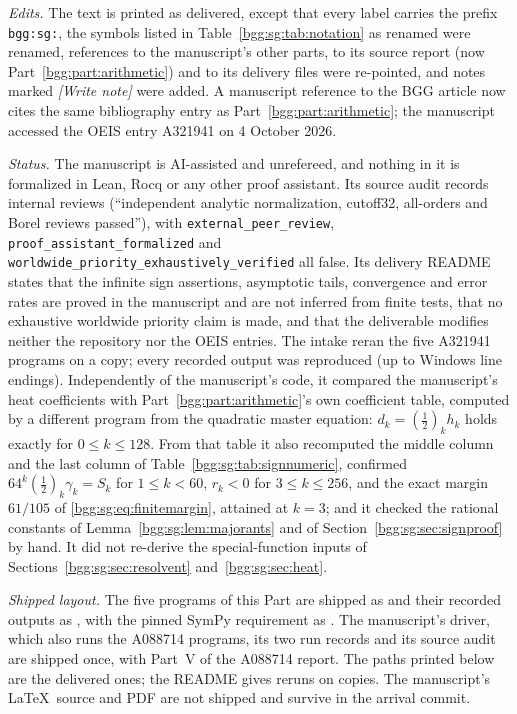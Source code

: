 \documentclass[11pt,a4paper]{article}
\numberwithin{equation}{section}
\theoremstyle{definition}
\theoremstyle{remark}
\theoremstyle{definition}
\begin{document}
\emph{Edits.} The text is printed as delivered, except that every label
carries the prefix \texttt{bgg:sg:}, the symbols listed in
Table~\ref{bgg:sg:tab:notation} as renamed were renamed, references to
the manuscript's other parts, to its source report (now
Part~\ref{bgg:part:arithmetic}) and to its delivery files were
re-pointed, and notes marked \emph{[Write note]} were added. A
manuscript reference to the BGG article now cites the same
bibliography entry as Part~\ref{bgg:part:arithmetic}; the manuscript
accessed the OEIS entry A321941 on 4 October 2026.

\emph{Status.} The manuscript is AI-assisted and unrefereed, and nothing
in it is formalized in Lean, Rocq or any other proof assistant. Its
source audit records internal reviews (``independent analytic
normalization, cutoff32, all-orders and Borel reviews passed''), with
\texttt{external\_peer\_review}, \texttt{proof\_assistant\_formalized} and
\texttt{worldwide\_priority\_exhaustively\_verified} all false. Its
delivery README states that the infinite sign assertions, asymptotic
tails, convergence and error rates are proved in the manuscript and are
not inferred from finite tests, that no exhaustive worldwide priority
claim is made, and that the deliverable modifies neither the repository
nor the OEIS entries. The intake reran the five A321941 programs on a
copy; every recorded output was reproduced (up to Windows line
endings). Independently of the manuscript's code, it compared the
manuscript's heat coefficients with Part~\ref{bgg:part:arithmetic}'s own
coefficient table, computed by a different program from the quadratic
master equation: $d_k=(\tfrac12)_kh_k$ holds exactly for
$0\le k\le128$. From that table it also recomputed the middle column
and the last column of Table~\ref{bgg:sg:tab:signnumeric}, confirmed
$64^k(\tfrac12)_k\gamma_k=S_k$ for $1\le k<60$, $r_k<0$ for
$3\le k\le256$, and the exact margin $61/105$ of
\eqref{bgg:sg:eq:finitemargin}, attained at $k=3$; and it checked the
rational constants of Lemma~\ref{bgg:sg:lem:majorants} and of
Section~\ref{bgg:sg:sec:signproof} by hand. It did not re-derive the
special-function inputs of Sections~\ref{bgg:sg:sec:resolvent}
and~\ref{bgg:sg:sec:heat}.

\emph{Shipped layout.} The five programs of this Part are shipped as
 and their recorded outputs as
, with the pinned SymPy requirement as
. The manuscript's driver,
which also runs the A088714 programs, its two run records and its
source audit are shipped once, with Part~V of the A088714 report. The
paths printed below are the delivered ones; the README gives reruns on
copies. The manuscript's \LaTeX\ source and PDF are not shipped and
survive in the arrival commit.
\end{document}
